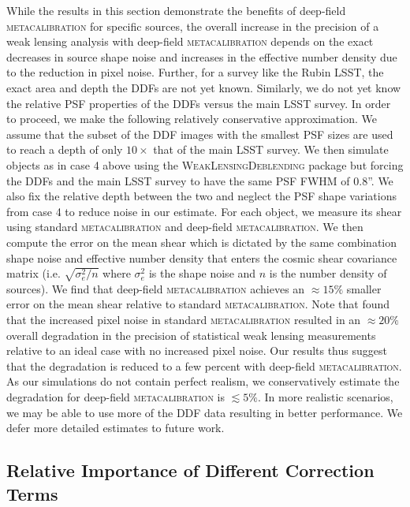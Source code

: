 \documentclass[twocolumn]{openjournal}
\makeatletter
\newcommand{\mcal}{\textsc{metacalibration}\@\xspace}
\newcommand{\descwl}{\textsc{WeakLensingDeblending}\@\xspace}
\makeatother
\begin{document}
While the results in this section demonstrate the benefits of deep-field \mcal for
specific sources, the overall increase in the precision of a weak lensing analysis with
deep-field \mcal depends on the exact decreases in source shape noise and increases in
the effective number density due to the reduction in pixel noise. Further, for a survey
like the Rubin LSST, the exact area and depth the DDFs are not yet known. Similarly, we
do not yet know the relative PSF properties of the DDFs versus the main LSST survey. In
order to proceed, we make the following relatively conservative approximation. We assume
that the subset of the DDF images with the smallest PSF sizes are used to reach a depth
of only $10\times$ that of the main LSST survey. We then simulate objects as in case 4
above using the \descwl package but forcing the DDFs and the main LSST survey
to have the same PSF FWHM of 0.8''. We also fix the relative depth between the two and
neglect the PSF shape variations from case 4 to reduce noise in our estimate. For each
object, we measure its shear using standard \mcal and deep-field \mcal. We then compute
the error on the mean shear which is dictated by the same combination shape noise and
effective number density that enters the cosmic shear covariance matrix (i.e.
$\sqrt{\sigma_e^2/n}$ where $\sigma_e^2$ is the shape noise and $n$ is the number density
of sources). We find that deep-field \mcal achieves an $\approx15\%$ smaller
error on the mean shear relative to standard \mcal.  Note that
\citet{SheldonMcal2017} found that the increased pixel noise in standard
\mcal resulted in an $\approx 20\%$ overall degradation in the precision of
statistical weak lensing measurements relative to an ideal case with no increased pixel
noise.  Our results thus suggest that the degradation
is reduced to a few percent with deep-field \mcal.  As our simulations do
not contain perfect realism, we conservatively estimate the degradation for deep-field
\mcal is $\lesssim5\%$.  In more realistic scenarios, we may be able to use more of the DDF
data resulting in better performance. We defer more detailed estimates to future work.

\subsection{Relative Importance of Different Correction Terms}\label{sec:terms}
\end{document}
